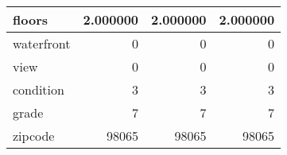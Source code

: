 \begin{table}[H]
\begin{tabular}{|l|r|r|r|}
\hline floors & \cellcolor[rgb]{0.9, 0.54, 0.52} 2.000000 & \cellcolor[rgb]{0.9, 0.54, 0.52} 2.000000 & \cellcolor[rgb]{0.9, 0.54, 0.52} 2.000000 \\
\hline waterfront & \cellcolor[rgb]{0.9, 0.54, 0.52} 0 & \cellcolor[rgb]{0.9, 0.54, 0.52} 0 & \cellcolor[rgb]{0.9, 0.54, 0.52} 0 \\
\hline view & \cellcolor[rgb]{0.9, 0.54, 0.52} 0 & \cellcolor[rgb]{0.9, 0.54, 0.52} 0 & \cellcolor[rgb]{0.9, 0.54, 0.52} 0 \\
\hline condition & \cellcolor[rgb]{0.9, 0.54, 0.52} 3 & \cellcolor[rgb]{0.9, 0.54, 0.52} 3 & \cellcolor[rgb]{0.9, 0.54, 0.52} 3 \\
\hline grade & \cellcolor[rgb]{0.9, 0.54, 0.52} 7 & \cellcolor[rgb]{0.9, 0.54, 0.52} 7 & \cellcolor[rgb]{0.9, 0.54, 0.52} 7 \\
\hline zipcode & \cellcolor[rgb]{0.9, 0.54, 0.52} 98065 & \cellcolor[rgb]{0.9, 0.54, 0.52} 98065 & \cellcolor[rgb]{0.9, 0.54, 0.52} 98065 \\
\hline
\end{tabular}
\end{table}
